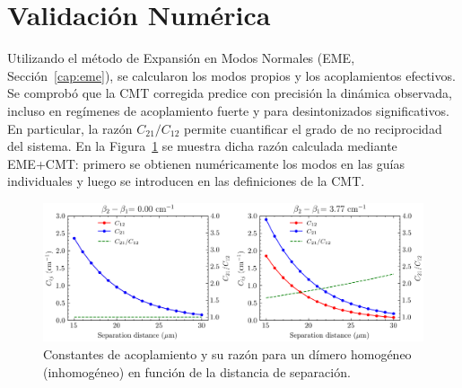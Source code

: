 \section{Validación Numérica}

Utilizando el método de Expansión en Modos Normales (EME, Sección~\ref{cap:eme}), se calcularon los modos propios y los acoplamientos efectivos. Se comprobó que la CMT corregida predice con precisión la dinámica observada, incluso en regímenes de acoplamiento fuerte y para desintonizados significativos. En particular, la razón \( C_{21}/C_{12} \) permite cuantificar el grado de no reciprocidad del sistema. En la Figura~\ref{fig:nonotrho-num} se muestra dicha razón calculada mediante EME+CMT: primero se obtienen numéricamente los modos en las guías individuales y luego se introducen en las definiciones de la CMT.
\begin{figure}[H]
	\centering
	\includegraphics[width=\linewidth]{media/cij-nonortho.png}
	\caption{Constantes de acoplamiento y su razón para un dímero homogéneo (inhomogéneo) en función de la distancia de separación. \label{fig:nonotrho-num}}
\end{figure}
